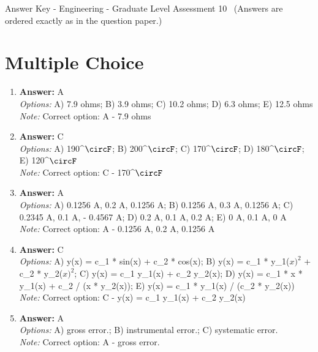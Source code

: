 \documentclass[12pt]{article}
\begin{document}
\begin{center}
Answer Key - Engineering - Graduate Level Assessment 10 \
\small (Answers are ordered exactly as in the question paper.)
\end{center}

\section*{Multiple Choice}
\begin{enumerate}[label=\arabic*.]
\item \textbf{Answer:} A
\\ \textit{Options:} A) 7.9 ohms; B) 3.9 ohms; C) 10.2 ohms; D) 6.3 ohms; E) 12.5 ohms
\\ \textit{Note:} Correct option: A - 7.9 ohms
\item \textbf{Answer:} C
\\ \textit{Options:} A) 190^\ensuremath{\circF}; B) 200^\ensuremath{\circF}; C) 170^\ensuremath{\circF}; D) 180^\ensuremath{\circF}; E) 120^\ensuremath{\circF}
\\ \textit{Note:} Correct option: C - 170^\ensuremath{\circF}
\item \textbf{Answer:} A
\\ \textit{Options:} A) 0.1256 A, 0.2 A, 0.1256 A; B) 0.1256 A, 0.3 A, 0.1256 A; C) 0.2345 A, 0.1 A, - 0.4567 A; D) 0.2 A, 0.1 A, 0.2 A; E) 0 A, 0.1 A, 0 A
\\ \textit{Note:} Correct option: A - 0.1256 A, 0.2 A, 0.1256 A
\item \textbf{Answer:} C
\\ \textit{Options:} A) y(x) = c\_1 * sin(x) + c\_2 * cos(x); B) y(x) = c\_1 * y\_1($x)^2$ + c\_2 * y\_2($x)^2$; C) y(x) = c\_1 y\_1(x) + c\_2 y\_2(x); D) y(x) = c\_1 * x * y\_1(x) + c\_2 / (x * y\_2(x)); E) y(x) = c\_1 * y\_1(x) / (c\_2 * y\_2(x))
\\ \textit{Note:} Correct option: C - y(x) = c\_1 y\_1(x) + c\_2 y\_2(x)
\item \textbf{Answer:} A
\\ \textit{Options:} A) gross error.; B) instrumental error.; C) systematic error.
\\ \textit{Note:} Correct option: A - gross error.
\end{enumerate}
\end{document}
